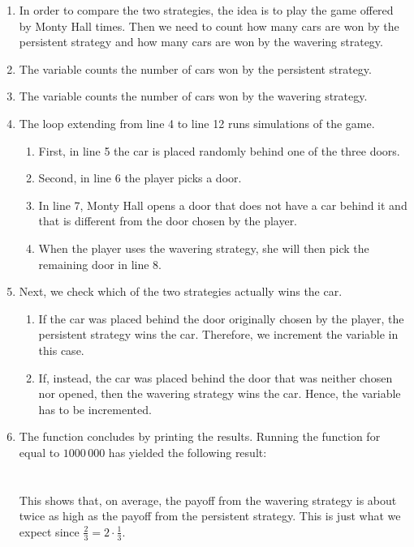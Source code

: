 \begin{enumerate}
\item In order to compare the two strategies, the idea is to play the game offered by Monty Hall
       times.  Then we need to count how many cars are won by the persistent strategy and how
      many cars are won by the wavering strategy.
\item The variable  counts the number of cars won by the persistent strategy.
\item The variable   counts the number of cars won by the wavering  strategy.
\item The  loop extending from line 4 to line 12 runs  simulations of the
       game.
       \begin{enumerate}
       \item First, in line 5 the car is placed randomly behind one of the three doors.
       \item Second, in line 6 the player picks a door.
       \item In line 7, Monty Hall opens a door that does not have a car behind it and that
             is different from the door chosen by the player.
       \item When the player uses the wavering strategy, she will then pick the remaining door in line 8.
       \end{enumerate}
\item Next, we check which of the two strategies actually wins the car.
      \begin{enumerate}
      \item If the car was placed behind the door originally chosen by the player, the persistent
            strategy wins the car.  Therefore, we increment the variable  in
            this case.
      \item If, instead, the car was placed behind the door that was neither chosen nor opened, then
            the wavering strategy wins the car.  Hence, the variable  has to be incremented.
      \end{enumerate}
\item The function concludes by printing the results.  Running the function for  equal to
      $1000\,000$ has yielded the following result:
      \\[0.2cm]
      \hspace*{1.3cm}
       \\ 
      \hspace*{1.3cm}
      \\[0.2cm]
      This shows that, on average, the payoff from the wavering strategy is about twice as high as the
      payoff from the persistent strategy.  This is just what we expect since $\frac{2}{3} = 2 \cdot \frac{1}{3}$.
\end{enumerate}


